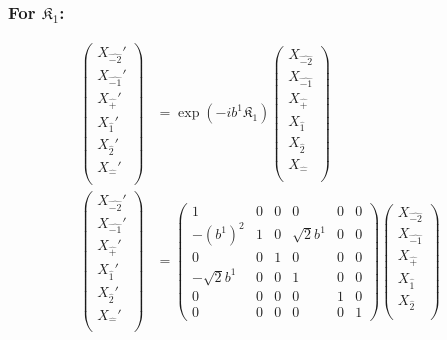 \documentclass[]{article}
\numberwithin{equation}{section}
\begin{document}
{{\subsubsection{For $\mathfrak{K}_{1}$:}
\begin{align}
\begin{pmatrix}
    {X}_{\hat{-2}}'\\
    {X}_{\hat{-1}}'\\
    {X}_{\hat{+}}'\\
    {X}_{\hat{1}}'\\
    {X}_{\hat{2}}'\\
    {X}_{\hat{-}}'\\
    \end{pmatrix}&= \exp{(-ib^{1} \mathfrak{K}_{1})}\begin{pmatrix}
    {X}_{\hat{-2}}\\
    {X}_{\hat{-1}}\\
    {X}_{\hat{+}}\\
    {X}_{\hat{1}}\\
    {X}_{\hat{2}}\\
    {X}_{\hat{-}}\\
    \end{pmatrix}\\
    \begin{pmatrix}
    {X}_{\hat{-2}}'\\
    {X}_{\hat{-1}}'\\
    {X}_{\hat{+}}'\\
    {X}_{\hat{1}}'\\
    {X}_{\hat{2}}'\\
    {X}_{\hat{-}}'\\
    \end{pmatrix}&= \begin{pmatrix}
        1&0&0&0&0&0\\
        -(b^{1})^{2}&1&0&\sqrt{2}b^{1}&0&0\\
        0&0&1&0&0&0\\
        -\sqrt{2}b^{1}&0&0&1&0&0\\
        0&0&0&0&1&0\\
        0&0&0&0&0&1
    \end{pmatrix}\begin{pmatrix}
    {X}_{\hat{-2}}\\
    {X}_{\hat{-1}}\\
    {X}_{\hat{+}}\\
    {X}_{\hat{1}}\\
    {X}_{\hat{2}}\\

\end{pmatrix}
\end{align}}}
\end{document}
